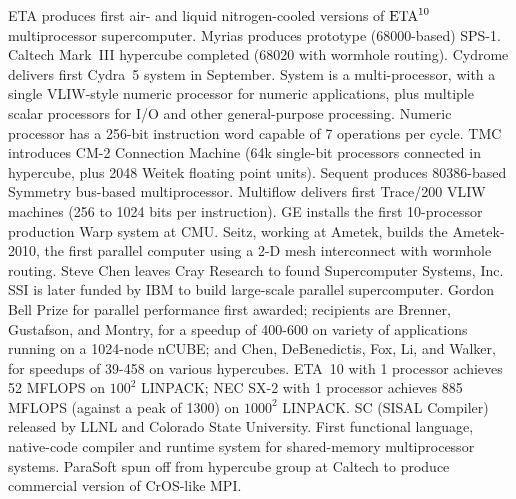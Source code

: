 	{ETA produces first air- and liquid nitrogen-cooled versions
	of ${\rm{ETA}}^{10}$ multiprocessor supercomputer.}
	{Myrias produces prototype (68000-based) SPS-1.}
	{Caltech Mark~III hypercube completed (68020 with wormhole routing).}
	{Cydrome delivers first Cydra~5 system in September.
	System is a multi-processor,
	with a single VLIW-style numeric processor for numeric applications,
	plus multiple scalar processors
	for I/O and other general-purpose processing.
	Numeric processor has a 256-bit instruction word
	capable of 7 operations per cycle.}
	{TMC introduces CM-2 Connection Machine
	(64k single-bit processors connected in hypercube,
	plus 2048 Weitek floating point units).}
	{Sequent produces 80386-based Symmetry bus-based multiprocessor.}
	{Multiflow delivers first Trace/200 VLIW machines
	(256 to 1024 bits per instruction).}
	{GE installs the first 10-processor production Warp system at CMU.}
	{Seitz, working at Ametek, builds the Ametek-2010,
	the first parallel computer
	using a 2-D mesh interconnect with wormhole routing.}
	{Steve Chen leaves Cray Research to found
	Supercomputer Systems, Inc.
	SSI is later funded by IBM to build
	large-scale parallel supercomputer.}
	{Gordon Bell Prize for parallel performance first awarded;
	recipients are Brenner, Gustafson, and Montry,
	for a speedup of 400-600 on variety of applications
	running on a 1024-node nCUBE;
	and Chen, DeBenedictis, Fox, Li, and Walker,
	for speedups of 39-458 on various hypercubes.}
	{ETA~10 with 1 processor achieves 52 MFLOPS
	on $100^2$ LINPACK;
	NEC SX-2 with 1 processor achieves 885 MFLOPS
	(against a peak of 1300)
	on $1000^2$ LINPACK.}
	{SC (SISAL Compiler) released by LLNL and Colorado State University.
	First functional language, native-code compiler and runtime system
	for shared-memory multiprocessor systems.}
	{ParaSoft spun off from hypercube group at Caltech
	to produce commercial version of CrOS-like MPI.}

